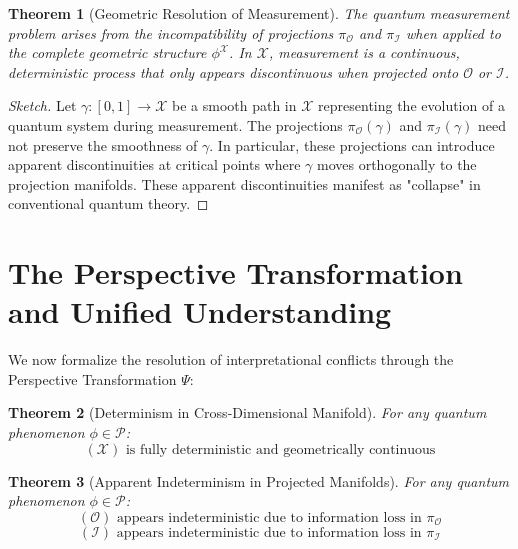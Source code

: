 \documentclass{article}
\newtheorem{theorem}{Theorem}
\begin{document}
\begin{theorem}[Geometric Resolution of Measurement]
The quantum measurement problem arises from the incompatibility of projections $\pi_{\mathcal{O}}$ and $\pi_{\mathcal{I}}$ when applied to the complete geometric structure $\phi^{\mathcal{X}}$. In $\mathcal{X}$, measurement is a continuous, deterministic process that only appears discontinuous when projected onto $\mathcal{O}$ or $\mathcal{I}$.
\end{theorem}

\begin{proof}[Sketch]
Let $\gamma: [0,1] \to \mathcal{X}$ be a smooth path in $\mathcal{X}$ representing the evolution of a quantum system during measurement. The projections $\pi_{\mathcal{O}}(\gamma)$ and $\pi_{\mathcal{I}}(\gamma)$ need not preserve the smoothness of $\gamma$. In particular, these projections can introduce apparent discontinuities at critical points where $\gamma$ moves orthogonally to the projection manifolds. These apparent discontinuities manifest as "collapse" in conventional quantum theory.
\end{proof}

\section{The Perspective Transformation and Unified Understanding}

We now formalize the resolution of interpretational conflicts through the Perspective Transformation $\Psi$:

\begin{theorem}[Determinism in Cross-Dimensional Manifold]
For any quantum phenomenon $\phi \in \mathcal{P}$:
\begin{equation}
[\Psi^{-1}(\phi)](\mathcal{X}) \text{ is fully deterministic and geometrically continuous}
\end{equation}
\end{theorem}

\begin{theorem}[Apparent Indeterminism in Projected Manifolds]
For any quantum phenomenon $\phi \in \mathcal{P}$:
\begin{equation}
[\Psi^{-1}(\phi)](\mathcal{O}) \text{ appears indeterministic due to information loss in } \pi_{\mathcal{O}}
\end{equation}
\begin{equation}
[\Psi^{-1}(\phi)](\mathcal{I}) \text{ appears indeterministic due to information loss in } \pi_{\mathcal{I}}
\end{equation}
\end{theorem}
\end{document}
